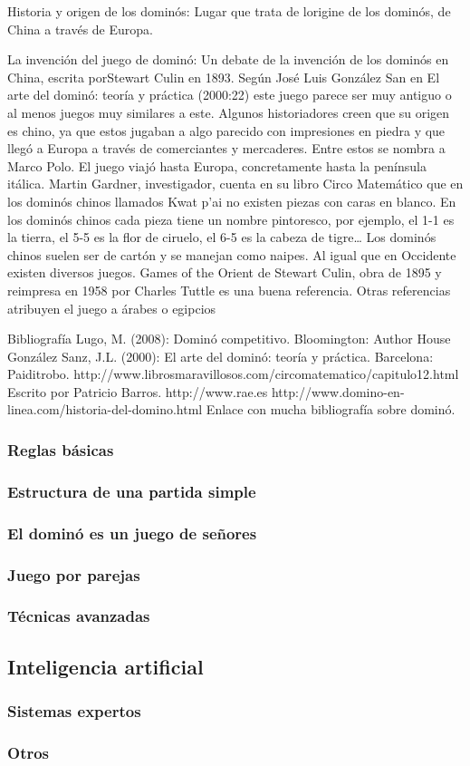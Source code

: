 Historia y origen de los dominós:
Lugar que trata de lorigine de los dominós, de China a través de Europa.

La invención del juego de dominó:
Un debate de la invención de los dominós en China, escrita porStewart Culin en 1893.
Según José Luis González San en El arte del dominó: teoría y práctica (2000:22) este juego parece ser muy antiguo o al menos juegos muy similares a este. Algunos historiadores creen que su origen es chino, ya que estos jugaban a algo parecido con impresiones en piedra y que llegó a Europa a través de comerciantes y mercaderes. Entre estos se nombra a Marco Polo. El juego viajó hasta Europa, concretamente hasta la  península itálica.
Martin Gardner, investigador, cuenta en su libro Circo Matemático que en los dominós chinos llamados Kwat p’ai no existen piezas con caras en blanco. En los dominós chinos cada pieza tiene un nombre pintoresco, por ejemplo, el 1-1 es la tierra, el 5-5 es la flor de ciruelo, el 6-5 es la cabeza de tigre…
Los dominós chinos suelen ser de cartón y se manejan como naipes. Al igual que en Occidente existen diversos juegos. Games of the Orient de Stewart Culin, obra de 1895 y reimpresa en 1958 por Charles Tuttle es una buena referencia.
Otras referencias atribuyen el juego a árabes o egipcios
 
Bibliografía
Lugo, M. (2008): Dominó competitivo. Bloomington: Author House
González Sanz, J.L. (2000): El arte del dominó: teoría y práctica. Barcelona: Paiditrobo.
http://www.librosmaravillosos.com/circomatematico/capitulo12.html Escrito por Patricio Barros.
http://www.rae.es
http://www.domino-en-linea.com/historia-del-domino.html
Enlace con mucha bibliografía sobre dominó.
 

\subsubsection{Reglas básicas}
\subsubsection{Estructura de una partida simple}
\subsubsection{El dominó es un juego de señores}
\subsubsection{Juego por parejas}
\subsubsection{Técnicas avanzadas}


\subsection{Inteligencia artificial}

\subsubsection{Sistemas expertos}
\subsubsection{Otros}
